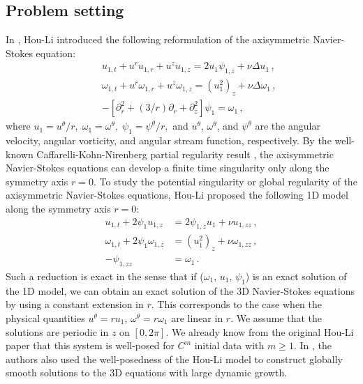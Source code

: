 \documentclass[12pt]{caltech_thesis}
\numberwithin{equation}{section}
\begin{document}
\subsection{Problem setting}
In \cite{hou2008dynamic},
Hou-Li introduced the following reformulation of the axisymmetric Navier-Stokes equation:
\begin{eqnarray}
\label{3d}
&&u_{1, t}+u^{r} u_{1, r}+u^{z} u_{1, z} =2 u_{1} \psi_{1, z}+\nu\Delta u_1\,, \\
&&\omega_{1, t}+u^{r} \omega_{1, r}+u^{z} \omega_{1, z} =\left(u_{1}^{2}\right)_{z}+\nu\Delta \omega_1\,, \\
&&-\left[\partial_{r}^{2}+(3 / r) \partial_{r}+\partial_{z}^{2}\right] \psi_{1} =\omega_{1}\,,
\end{eqnarray}
where $u_1 = u^\theta/r,\; \omega_1 = \omega^\theta,\; \psi_1 = \psi^\theta/r, $ and $u^\theta$, $\omega^\theta$, and $\psi^\theta$ are the angular velocity, angular vorticity, and angular stream function, respectively. 
By the well-known Caffarelli-Kohn-Nirenberg partial regularity result \cite{caffarelli1982partial}, the axisymmetric Navier-Stokes equations can develop a finite time singularity only along the symmetry axis $r=0$. To study the potential singularity or global regularity of the axisymmetric Navier-Stokes equations,
Hou-Li \cite{hou2008dynamic} proposed the following 1D model along the symmetry axis $r=0$:
\begin{equation}
\label{1d}
\begin{aligned}
u_{1, t}+2 \psi_1 u_{1, z} &=2 \psi_{1, z} u_1 +\nu u_{1,zz}\,, \\
\omega_{1, t}+2 \psi_1 \omega_{1, z} &=\left(u_1^{2}\right)_{z}+\nu \omega_{1,zz}\,, \\
- \psi_{1,zz} &=\omega_1\,.
\end{aligned}
\end{equation}
Such a reduction is exact in the sense that if ($\omega_1$, $u_1$, $\psi_1$) is an exact solution of the 1D model, we can obtain an exact solution of the 3D Navier-Stokes equations by using a constant extension in $r$. This corresponds to the case when the physical quantities $u^{\theta}=ru_1$, $\omega^{\theta}=r\omega_1$ are linear in $r$.
We assume that the solutions are periodic in $z$ on $[0,2\pi]$.
We already know from the original Hou-Li paper that this system is well-posed for $C^m$ initial data with $m \geq 1$.  In \cite{hou2008dynamic}, the authors also used the well-posedness of the Hou-Li model to construct globally smooth solutions to the 3D equations with large dynamic growth.
\end{document}
